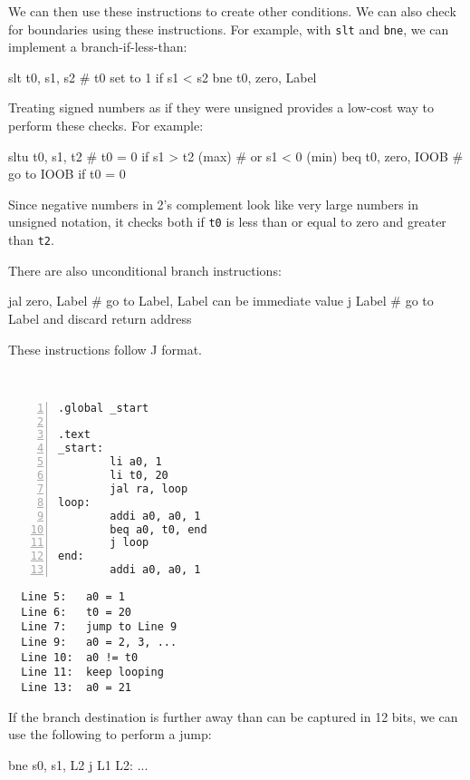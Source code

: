 We can then use these instructions to create other conditions. We can also check for boundaries using these instructions. For example, with \verb|slt| and \verb|bne|, we can implement a branch-if-less-than:
\begin{codeBlock}
  slt t0, s1, s2        # t0 set to 1 if s1 < s2
  bne t0, zero, Label
\end{codeBlock}

Treating signed numbers as if they were unsigned provides a low-cost way to perform these checks. For example:
\begin{codeBlock}
  sltu t0, s1, t2       # t0 = 0 if s1 > t2 (max)
                        # or s1 < 0 (min)
  beq t0, zero, IOOB    # go to IOOB if t0 = 0
\end{codeBlock}

Since negative numbers in 2's complement look like very large numbers in unsigned notation, it checks both if \verb|t0| is less than or equal to zero and greater than \verb|t2|. 

There are also unconditional branch instructions:
\begin{codeBlock}
  jal zero, Label   # go to Label, Label can be immediate value
  j Label           # go to Label and discard return address
\end{codeBlock}

These instructions follow J format. 

\begin{eg}~

\begin{minipage}{0.5\textwidth}
\begin{Verbatim}[numbers=left,xleftmargin=5mm]
.global _start

.text
_start:
        li a0, 1
        li t0, 20
        jal ra, loop 
loop:
        addi a0, a0, 1
        beq a0, t0, end 
        j loop
end:    
        addi a0, a0, 1
\end{Verbatim}
\end{minipage}
\begin{minipage}{0.5\textwidth}
\color{red}
\begin{verbatim}
  Line 5:   a0 = 1
  Line 6:   t0 = 20
  Line 7:   jump to Line 9
  Line 9:   a0 = 2, 3, ...
  Line 10:  a0 != t0
  Line 11:  keep looping
  Line 13:  a0 = 21
\end{verbatim}
\end{minipage}
\end{eg}

If the branch destination is further away than can be captured in 12 bits, we can use the following to perform a jump:
\begin{codeBlock}
  bne s0, s1, L2
  j L1
L2: ...
\end{codeBlock}

